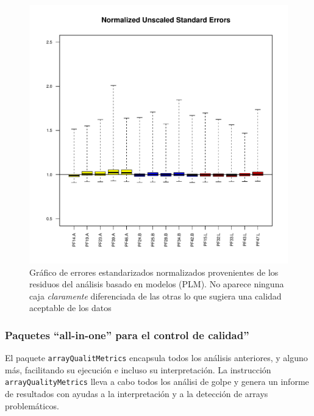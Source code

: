 \documentclass[a4paper]{article}\usepackage[]{graphicx}\usepackage[]{color}
\makeatletter
\def\maxwidth{ %
  \ifdim\Gin@nat@width>\linewidth
    \linewidth
  \else
    \Gin@nat@width
  \fi
}
\newenvironment{knitrout}{}{} %
\newcommand{\Rpackage}[1]{{\texttt{#1}}}
\makeatother
\begin{document}
\begin{figure}[htbp]
 \centering
\begin{knitrout}
\color{fgcolor}
\includegraphics[width=\maxwidth]{images/graficplotNUSE-1} 

\end{knitrout}
\caption{Gráfico de errores estandarizados normalizados provenientes de los residuos del análisis basado en modelos (PLM).
 No aparece ninguna caja \emph{claramente} diferenciada de las otras lo que sugiera una calidad aceptable de los datos}
\label{fig:RLE}
\end{figure}

\subsubsection{Paquetes ``all-in-one'' para el control de calidad''}

El paquete \Rpackage{arrayQualitMetrics} encapsula todos los análisis anteriores, y alguno más, facilitando su ejecución e incluso su interpretación. La instrucción \texttt{arrayQualityMetrics} lleva a cabo todos los análisi de golpe y genera un informe de resultados con ayudas a la interpretación y a la detección de arrays problemáticos.
\end{document}
